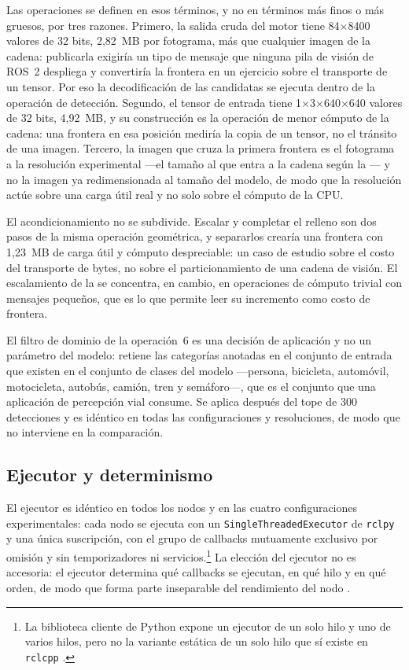 Las operaciones se definen en esos términos, y no en términos más finos o
más gruesos, por tres razones. Primero, la salida cruda del motor tiene
84$\times$8400 valores de 32 bits, 2,82~MB por fotograma, más que cualquier
imagen de la cadena: publicarla exigiría un tipo de mensaje que ninguna pila
de visión de ROS~2 despliega y convertiría la frontera en un ejercicio sobre
el transporte de un tensor. Por eso la decodificación de las candidatas se
ejecuta dentro de la operación de detección. Segundo, el tensor de entrada
tiene 1$\times$3$\times$640$\times$640 valores de 32 bits, 4,92~MB, y su
construcción es la operación de menor cómputo de la cadena: una frontera en
esa posición mediría la copia de un tensor, no el tránsito de una imagen.
Tercero, la imagen que cruza la primera frontera es el fotograma a la
resolución experimental ---el tamaño al que entra a la cadena según la
--- y no la imagen ya redimensionada al tamaño del
modelo, de modo que la resolución actúe sobre una carga útil real y no solo
sobre el cómputo de la CPU.

El acondicionamiento no se subdivide. Escalar y completar el relleno son dos
pasos de la misma operación geométrica, y separarlos crearía una frontera con
1,23~MB de carga útil y cómputo despreciable: un caso de estudio sobre el
costo del transporte de bytes, no sobre el particionamiento de una cadena de
visión. El escalamiento de la  se concentra, en
cambio, en operaciones de cómputo trivial con mensajes pequeños, que es lo
que permite leer su incremento como costo de frontera.

El filtro de dominio de la operación~6 es una decisión de aplicación y no un
parámetro del modelo: retiene las categorías anotadas en el conjunto de
entrada que existen en el conjunto de clases del modelo ---persona, bicicleta,
automóvil, motocicleta, autobús, camión, tren y semáforo---, que es el
conjunto que una aplicación de percepción vial consume. Se aplica después del
tope de 300 detecciones y es idéntico en todas las configuraciones y
resoluciones, de modo que no interviene en la comparación.

\subsection{Ejecutor y determinismo}
\label{sec:executor}

El ejecutor es idéntico en todos los nodos y en las cuatro configuraciones
experimentales: cada nodo se ejecuta con un \texttt{SingleThreadedExecutor}
de \texttt{rclpy} y una única suscripción, con el grupo de callbacks
mutuamente exclusivo por omisión y sin temporizadores ni servicios.\footnote{%
La biblioteca cliente de Python expone un ejecutor de un solo hilo y uno de
varios hilos, pero no la variante estática de un solo hilo que sí existe en
\texttt{rclcpp} \cite{rosjazzyrclpy}.} La elección del ejecutor no es
accesoria: el ejecutor determina qué callbacks se ejecutan, en qué hilo y en
qué orden, de modo que forma parte inseparable del rendimiento del nodo
\cite{macenski2023, casini2026}.

